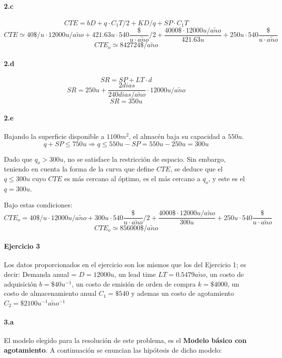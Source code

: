 \documentclass[a4paper,10pt]{article}
\def \anio {a\tilde{n}o}
\begin{document}
  \paragraph{2.c}
        $$ CTE = b D + q \cdot C_1 T / 2 + K D / q + SP \cdot C_1 T $$
        $$ CTE \simeq 40\$/u \cdot 12000u/\anio + 421.63u \cdot 540\frac{\$}{u\cdot\anio} / 2 + \frac{4000\$ \cdot 12000u/\anio}{421.63u} + 250u \cdot 540\frac{\$}{u\cdot\anio}$$
        $$ \boxed{ CTE_o \simeq 842724\$/\anio } $$


  \paragraph{2.d}
        $$ SR = SP + LT \cdot d $$
        $$ SR = 250u + \frac{2 dias}{240dias/\anio} \cdot 12000u/\anio $$
        $$ \boxed{ SR = 350u } $$

  \paragraph{2.e}
    Bajando la superficie disponible a $1100m^2$, el almacén baja su capacidad a $550u$.
    $$ q + SP \le 750u \Rightarrow q \le 550u - SP = 550u - 250u = 300u $$

    Dado que $q_o > 300u$, no se satisface la restricción de espacio. Sin embargo, teniendo en cuenta la forma de la curva que define $CTE$, se deduce que el $q \le 300u$ cuyo $CTE$ es más cercano al óptimo, es el más cercano a $q_o$, y este es el $q = 300u$.

    Bajo estas condiciones:
        $$ CTE_o = 40\$/u \cdot 12000u/\anio + 300u \cdot 540\frac{\$}{u\cdot\anio} / 2 + \frac{4000\$ \cdot 12000u/\anio}{300u} + 250u \cdot 540\frac{\$}{u\cdot\anio}$$
        $$ \boxed{ CTE_o \simeq 856000\$/\anio } $$


\paragraph{Ejercicio 3}

Los datos proporcionados en el ejercicio son los mismos que los del Ejercicio 1; es decir:
Demanda anual = $ D = 12000 u $, un lead time $ LT = 0.5479 \anio $, un costo de adquisici\'on $ b = \$40 u^{-1} $, un costo de emisi\'on de orden de compra $ k = \$4000 $, 
un costo de almacenamiento anual $ C_1 = \$540 $ y ademas un costo de agotamiento $ C_2 = \$2100 u^{-1}\anio^{-1} $

  \paragraph{3.a}
   El modelo elegido para la resoluci\'on de este problema, es el {\bf Modelo b\'asico con agotamiento}. A continuaci\'on se enuncian las hip\'otesis de dicho modelo:
\end{document}
